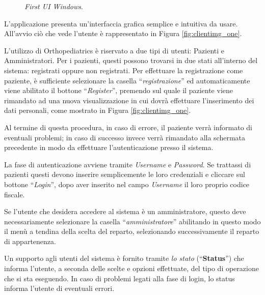\begin{figure}[p]
   \caption{\emph{First UI Windows}.}
   \label{fig:clientimg_one}
\end{figure}

L'applicazione presenta un'interfaccia grafica semplice e intuitiva
da usare. All'avvio ciò che vede l'utente è rappresentato in Figura 
\vref{fig:clientimg_one}.

L'utilizzo di Orthopediatrics è riservato a due tipi di utenti: Pazienti
e Amministratori. Per i pazienti, questi possono trovarsi in
due stati all'interno del sistema: registrati oppure non registrati.
Per effettuare la registrazione come paziente, è sufficiente selezionare
la casella {}``\emph{registrazione}'' ed automaticamente
viene abilitato il bottone {}``\emph{Register}'', premendo sul quale
il paziente viene rimandato ad una nuova visualizzazione in cui dovrà
effettuare l'inserimento dei dati personali, come mostrato in Figura 
\vref{fig:clientimg_one}.


Al termine di questa procedura, in caso di errore, il paziente verrà
informato di eventuali problemi; in caso di successo invece verrà
rimandato alla schermata precedente in modo da effettuare l'autenticazione
presso il sistema.

La fase di autenticazione avviene tramite \emph{Username} e \emph{Password}.
Se trattassi di pazienti questi devono inserire semplicemente le loro
credenziali e cliccare sul bottone {}``\emph{Login}'', dopo aver inserito
nel campo \emph{Username} il loro proprio codice fiscale.

Se l'utente che desidera accedere al sistema è un amministratore,
questo deve necessariamente selezionare la casella {}``\emph{amministratore}''
abilitando in questo modo il menù a tendina della scelta del reparto, selezionando
successivamente il reparto di appartenenza.

Un supporto agli utenti del sistema è fornito tramite \emph{lo stato}
({}``\textbf{Status}'') che informa l'utente, a seconda delle scelte
e opzioni effettuate, del tipo di operazione che si sta eseguendo.
In caso di problemi legati alla fase di login, lo status informa l'utente
di eventuali errori.

